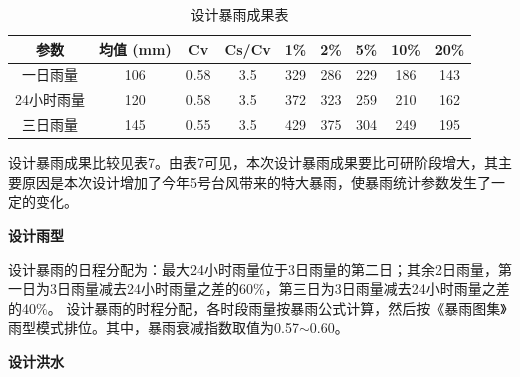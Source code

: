 \documentclass[UTF8, a4paper, 12pt]{ctexart} %
\begin{document}
\begin{table}[h]
    \centering
    \caption{设计暴雨成果表}
    \begin{tabular}{|c|c|c|c|c|c|c|c|c|}
        \hline
        参数 & 均值 (mm) & Cv & Cs/Cv & 1\% & 2\% & 5\% & 10\% & 20\% \\ \hline
        一日雨量 & 106 & 0.58 & 3.5 & 329 & 286 & 229 & 186 & 143 \\ \hline
        24小时雨量 & 120 & 0.58 & 3.5 & 372 & 323 & 259 & 210 & 162 \\ \hline
        三日雨量 & 145 & 0.55 & 3.5 & 429 & 375 & 304 & 249 & 195 \\ \hline
    \end{tabular}
    \label{tab:design_rainfall_results}
\end{table}
设计暴雨成果比较见表7。由表7可见，本次设计暴雨成果要比可研阶段增大，其主要原因是本次设计增加了今年5号台风带来的特大暴雨，使暴雨统计参数发生了一定的变化。
\newpage
\begin{table}[h]
    \centering
    \caption{设计暴雨成果比较表}
    \label{tab:design_rainfall_comparison}
\end{table}

\par \textbf{设计雨型}
\par
设计暴雨的日程分配为：最大24小时雨量位于3日雨量的第二日；其余2日雨量，第一日为3日雨量减去24小时雨量之差的60\%，第三日为3日雨量减去24小时雨量之差的40\%。
设计暴雨的时程分配，各时段雨量按暴雨公式计算，然后按《暴雨图集》雨型模式排位。其中，暴雨衰减指数取值为0.57$\sim$0.60。
\par \textbf{设计洪水}
\end{document}
